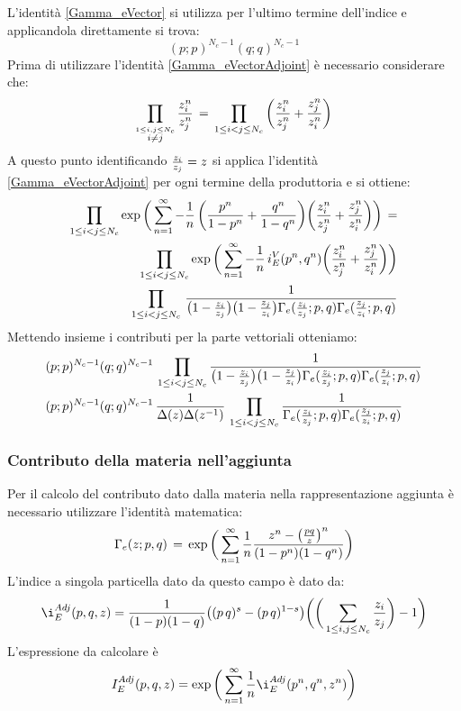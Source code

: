 \documentclass[a4paper,12pt]{article}
\begin{document}
L'identità \ref{Gamma_eVector} si utilizza per l'ultimo termine dell'indice e applicandola direttamente si trova:
$$
	(p;p)^{N_c-1} ( q;q)^{N_c-1}
$$
 Prima di utilizzare l'identità \ref{Gamma_eVectorAdjoint} è necessario considerare che:
 $$
 \prod_{ \overset{ 1 \leq i,j \leq N_c}{ i\neq j }} {z_i^n \over z_j^n} \,  = \,
  \prod_{ 1 \leq i < j \leq N_c}\bigg( {z_i^n \over z_j^n} + {z_j^n \over z_i^n}   \bigg)
 $$
 A questo punto identificando $ {z_i \over z_j} = z$ si applica l'identità \ref{Gamma_eVectorAdjoint} per ogni termine della produttoria e si ottiene:
\begin{align*}
\prod_{ 1 \leq i < j \leq N_c} \exp \bigg( \sum_{n=1}^{\infty} - {1 \over n} \, \bigg( {p^n \over 1-p^n} + {q^n \over 1-q^n} \bigg)  \bigg( {z_i^n \over z_j^n} + {z_j^n \over z_i^n}\bigg) \bigg) \, =\\
\prod_{ 1 \leq i < j \leq N_c} \exp \bigg( \sum_{n=1}^{\infty} - {1 \over n} \, i_E^V(p^n,q^n)  \bigg( {z_i^n \over z_j^n} + {z_j^n \over z_i^n}\bigg) \bigg)
\\
 \prod_{ 1 \leq i < j \leq N_c}   \, \frac{ 1 } { \big( 1 -{ z_i \over z_j} \big) \big ( 1 - { z_j \over z_i} \big) \Gamma_e( {z_i \over z_j};p,q) \Gamma_e({z_j \over z_i}; p,q)  }
\end{align*}
 Mettendo insieme i contributi per la parte vettoriali otteniamo:
 \begin{align*}
& (p;p)^{N_c-1} ( q;q)^{N_c-1} \, \prod_{ 1 \leq i < j \leq N_c} \frac{ 1 }{ \big( 1 -{ z_i \over z_j} \big) \big ( 1 - { z_j \over z_i} \big) \Gamma_e( {z_i \over z_j};p,q) \Gamma_e({z_j \over z_i}; p,q)  } \\
& (p;p)^{N_c-1} ( q;q)^{N_c-1} \, \frac{1}{ \Delta(z) \Delta (z^{-1})} \, \prod_{ 1 \leq i < j \leq N_c} \frac{ 1 }{ \Gamma_e( {z_i \over z_j};p,q) \Gamma_e({z_j \over z_i}; p,q)}
\end{align*}




\subsubsection{Contributo della materia nell'aggiunta}
Per il calcolo del contributo dato dalla materia nella rappresentazione aggiunta è necessario utilizzare l'identità matematica:
$$
\Gamma_e(z;p,q) \, = \, \exp \bigg( \sum_{n=1}^{\infty} {1 \over n }
 \frac{ z^n - \big( {pq \over z} \big)^n }{(1-p^n) ( 1-q^n)} \bigg)
 \label{Gamma_eChiral}
$$
L'indice a singola particella dato da questo campo è dato da:
$$
\i_E^{Adj}(p,q,z) = {1 \over (1-p)(1-q)}
\big((p\,q)^{s}- (p\,q)^{1-s}\big) \bigg( \bigg(  \sum_{ 1 \leq i,j \leq N_c}  {z_i\over z_j}  \bigg)- 1 \bigg)
$$
L'espressione da calcolare è
\begin{equation}
I_E^{Adj}(p,q,z)  = \exp \bigg(  \sum_{n=1}^{\infty} {1 \over n } \i_E^{Adj}(p^n,q^n,z^n) \bigg)
\end{equation}
\end{document}
